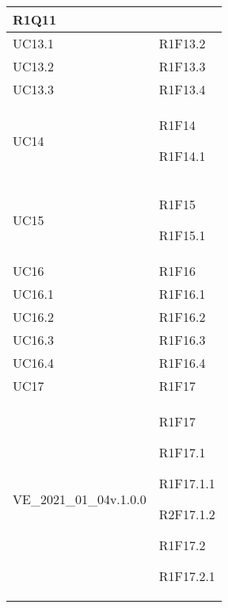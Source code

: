 \begin{center}
\begin{longtable}{|p{44mm}|p{22mm}|}
R1Q11 \newline
\\
\hline
UC13.1 &

R1F13.2 \newline
\\
\hline
UC13.2 &

R1F13.3 \newline
\\
\hline
UC13.3 &

R1F13.4 \newline
\\
\hline
UC14 &

R1F14 \newline

R1F14.1 \newline
\\
\hline
UC15 &

R1F15 \newline

R1F15.1 \newline
\\
\hline
UC16 &

R1F16 \newline
\\
\hline
UC16.1 &

R1F16.1 \newline
\\
\hline
UC16.2 &

R1F16.2 \newline
\\
\hline
UC16.3 &

R1F16.3 \newline
\\
\hline
UC16.4 &

R1F16.4 \newline
\\
\hline
UC17 &

R1F17 \newline
\\
\hline
VE\_2021\_01\_04v.1.0.0 &

R1F17 \newline

R1F17.1 \newline

R1F17.1.1 \newline

R2F17.1.2 \newline

R1F17.2 \newline

R1F17.2.1 \newline


\end{longtable}
\end{center}
